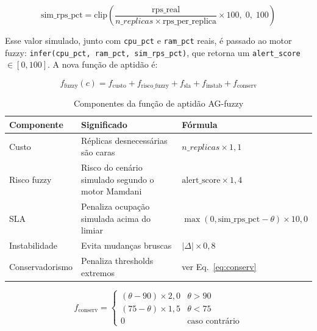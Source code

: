 \documentclass[12pt, a4paper]{article}
\begin{document}
\begin{equation}
  \text{sim\_rps\_pct} = \text{clip}\left(\frac{\text{rps\_real}}{n\_replicas \times \text{rps\_per\_replica}} \times 100,\; 0,\; 100\right)
\end{equation}

Esse valor simulado, junto com \texttt{cpu\_pct} e \texttt{ram\_pct} reais, é passado ao motor fuzzy: \texttt{infer(cpu\_pct, ram\_pct, sim\_rps\_pct)}, que retorna um \texttt{alert\_score} $\in [0, 100]$. A nova função de aptidão é:

\begin{equation}
  f_{\text{fuzzy}}(c) = f_{\text{custo}} + f_{\text{risco\_fuzzy}} + f_{\text{sla}} + f_{\text{instab}} + f_{\text{conserv}}
\end{equation}

\begin{table}[H]
  \centering
  \caption{Componentes da função de aptidão AG-fuzzy}
  \label{tab:fitness_fuzzy}
  \begin{tabularx}{\textwidth}{lXl}
    \toprule
    \rowcolor{headerblue}
    \textbf{Componente} & \textbf{Significado} & \textbf{Fórmula} \\
    \midrule
    Custo            & Réplicas desnecessárias são caras & $n\_replicas \times 1{,}1$ \\
    Risco fuzzy      & Risco do cenário simulado segundo o motor Mamdani & $\text{alert\_score} \times 1{,}4$ \\
    SLA              & Penaliza ocupação simulada acima do limiar & $\max(0, \text{sim\_rps\_pct} - \theta) \times 10{,}0$ \\
    Instabilidade    & Evita mudanças bruscas & $|\Delta| \times 0{,}8$ \\
    Conservadorismo  & Penaliza thresholds extremos & ver Eq.~\ref{eq:conserv} \\
    \bottomrule
  \end{tabularx}
\end{table}

\begin{equation}
  \label{eq:conserv}
  f_{\text{conserv}} =
  \begin{cases}
    (\theta - 90) \times 2{,}0 & \theta > 90 \\
    (75 - \theta) \times 1{,}5 & \theta < 75 \\
    0 & \text{caso contrário}
  \end{cases}
\end{equation}
\end{document}
